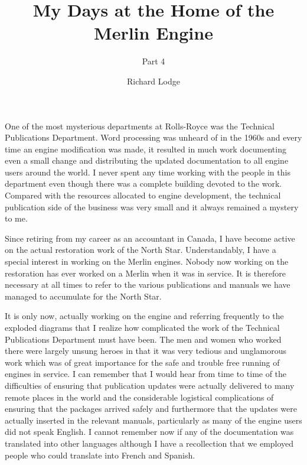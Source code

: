%


\title{My Days at the Home of the Merlin Engine}
\subtitle{Part 4}
\author{Richard Lodge}

\maketitle

One of the most mysterious departments at Rolls-Royce was the
Technical Publications Department. Word processing was unheard of in
the 1960s and every time an engine modification was made, it resulted
in much work documenting even a small change and distributing the
updated documentation to all engine users around the world. I never
spent any time working with the people in this department even though
there was a complete building devoted to the work. Compared with the
resources allocated to engine development, the technical publication
side of the business was very small and it always remained a mystery
to me.

Since retiring from my career as an accountant in Canada, I have
become active on the actual restoration work of the North
Star. Understandably, I have a special interest in working on the
Merlin engines. Nobody now working on the restoration has ever worked
on a Merlin when it was in service. It is therefore necessary at all
times to refer to the various publications and manuals we have managed
to accumulate for the North Star.

It is only now, actually working on the engine and referring
frequently to the exploded diagrams that I realize how complicated the
work of the Technical Publications Department must have been. The men
and women who worked there were largely unsung heroes in that it was
very tedious and unglamorous work which was of great importance for
the safe and trouble free running of engines in service. I can
remember that I would hear from time to time of the difficulties of
ensuring that publication updates were actually delivered to many
remote places in the world and the considerable logistical
complications of ensuring that the packages arrived safely and
furthermore that the updates were actually inserted in the relevant
manuals, particularly as many of the engine users did not speak
English. I cannot remember now if any of the documentation was
translated into other languages although I have a recollection that we
employed people who could translate into French and Spanish.

